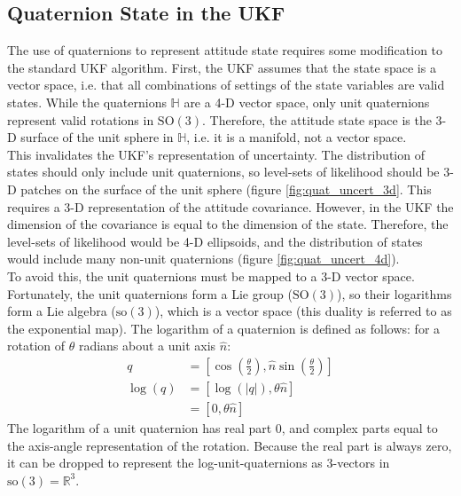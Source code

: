 \documentclass[conference]{IEEEtran}
\begin{document}
\subsection{Quaternion State in the UKF}
The use of quaternions to represent attitude state requires some modification to the standard UKF algorithm. First, the UKF assumes
that the state space is a vector space, i.e. that all combinations of settings of the state variables are valid states. While the quaternions $\mathbb{H}$ are a 4-D vector space, only unit quaternions represent valid rotations in $\mathrm{SO(3)}$. Therefore, the attitude state space is the 3-D surface of the unit sphere in $\mathbb{H}$, i.e. it is a manifold, not a vector space.\\

This invalidates the UKF's representation of uncertainty. The distribution of states should only include unit quaternions, so level-sets of likelihood should be 3-D patches on the surface of the unit sphere (figure \ref{fig:quat_uncert_3d}. This requires a 3-D representation of the attitude covariance. However, in the UKF the dimension of the covariance is equal to the dimension of the state. Therefore, the level-sets of likelihood would be 4-D ellipsoids, and the distribution of states would include many non-unit quaternions (figure \ref{fig:quat_uncert_4d}).\\

To avoid this, the unit quaternions must be mapped to a 3-D vector space. Fortunately, the unit quaternions form a Lie group ($\mathrm{SO(3)}$), so their logarithms form a Lie algebra ($\mathrm{so(3)}$), which is a vector space (this duality is referred to as the exponential map). The logarithm of a quaternion is defined as follows: for a rotation of $\theta$ radians about a unit axis $\hat{n}$:
\begin{align}
    q &= [\cos(\frac{\theta}{2}), \hat{n} \sin(\frac{\theta}{2})] \\
    \log(q) &= [\log(|q|), \theta \hat{n}]\\
        &= [0, \theta \hat{n}]
\end{align}
The logarithm of a unit quaternion has real part 0, and complex parts equal to the axis-angle representation of the rotation. Because the real part is always zero, it can be dropped to represent the log-unit-quaternions as 3-vectors in $\mathrm{so(3)} = \mathbb{R}^3$.\\
\end{document}
